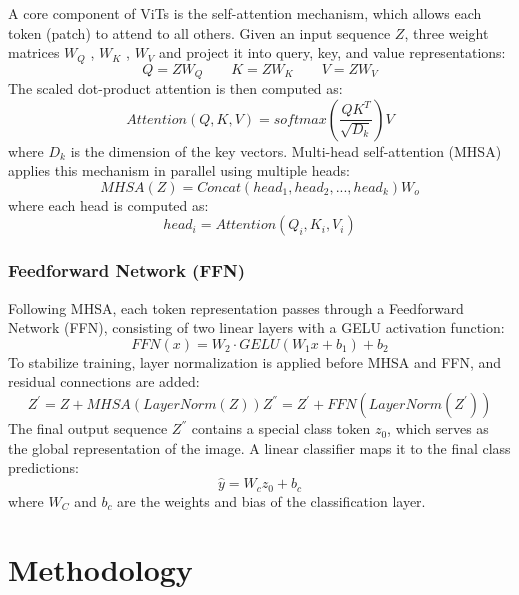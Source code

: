A core component of ViTs is the self-attention mechanism, which allows each token (patch) to attend to all others. Given an input sequence $Z$, three weight matrices $W_Q$ , $W_K$ , $W_V$ and  project it into query, key, and value representations:
\begin{equation}
    Q = ZW_Q \qquad K = ZW_K \qquad V = ZW_V
\end{equation}
The scaled dot-product attention is then computed as:
\begin{equation}
    Attention(Q,K,V) = softmax \left( \frac{QK^T}{\sqrt{D_k}} \right)V
\end{equation}
where $D_k$ is the dimension of the key vectors. Multi-head self-attention (MHSA) applies this mechanism in parallel using multiple heads:
\begin{equation}
    MHSA(Z) = Concat(head_1, head_2, ... , head_k)W_o
\end{equation}
where each head is computed as:
\begin{equation}
    head_i = Attention(Q_i, K_i, V_i)
\end{equation}

\subsubsection*{Feedforward Network (FFN)}

Following MHSA, each token representation passes through a Feedforward Network (FFN), consisting of two linear layers with a GELU activation function:
\begin{equation}
    FFN(x) = W_2 \cdot GELU(W_1 x+ b_1) + b_2
\end{equation}
To stabilize training, layer normalization is applied before MHSA and FFN, and residual connections are added:
\begin{equation}
    Z^{'} = Z + MHSA(LayerNorm(Z))Z^{''} = Z^{'} + FFN(LayerNorm(Z^{'}))
\end{equation}
The final output sequence $Z^{''}$  contains a special class token $z_0$, which serves as the global representation of the image. A linear classifier maps it to the final class predictions:
\begin{equation}
    \hat{y} = W_c z_0 + b_c
\end{equation}
where $W_C$ and $b_c$ are the weights and bias of the classification layer.

\section{Methodology}

